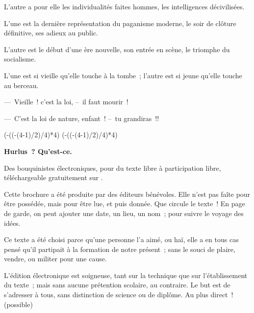 \documentclass[french,twoside]{book} %
\newcommand{\byline}[1]{\bigskip{\RaggedLeft{#1}\par}\bigskip}
\def\truncdiv#1#2{((#1-(#2-1)/2)/#2)}
\def\moduloop#1#2{(#1-\truncdiv{#1}{#2}*#2)}
\def\modulo#1#2{\number\numexpr\moduloop{#1}{#2}\relax}
\begin{document}
L’autre a pour elle les individualités faites hommes, les intelligences décivilisées.\par
L’une est la dernière représentation du paganisme moderne, le soir de clôture définitive, ses adieux au public.\par
L’autre est le début d’une ère nouvelle, son entrée en scène, le triomphe du socialisme.\par
L’une est si vieille qu’elle touche à la tombe ; l’autre est si jeune qu’elle touche au berceau.\par
— Vieille ! c’est la loi, – il faut mourir !\par
— C’est la loi de nature, enfant ! – tu grandiras !!\par

\byline{J. Déjacques.}
 


\ifbooklet
  \pagestyle{empty}
  \clearpage
  \ifnum\modulo{\value{page}}{4}=0 \hbox{}\newpage\hbox{}\newpage\fi
  \ifnum\modulo{\value{page}}{4}=1 \hbox{}\newpage\hbox{}\newpage\fi


  \hbox{}\newpage
  \ifodd\value{page}\hbox{}\newpage\fi
  {\centering\color{rubric}\bfseries\noindent\large
    Hurlus ? Qu’est-ce.\par
    \bigskip
  }
  \noindent Des bouquinistes électroniques, pour du texte libre à participation libre,
  téléchargeable gratuitement sur \href{https://hurlus.fr}{}.\par
  \bigskip
  \noindent Cette brochure a été produite par des éditeurs bénévoles.
  Elle n’est pas faîte pour être possédée, mais pour être lue, et puis donnée.
  Que circule le texte !
  En page de garde, on peut ajouter une date, un lieu, un nom ; pour suivre le voyage des idées.
  \par

  Ce texte a été choisi parce qu’une personne l’a aimé,
  ou haï, elle a en tous cas pensé qu’il partipait à la formation de notre présent ;
  sans le souci de plaire, vendre, ou militer pour une cause.
  \par

  L’édition électronique est soigneuse, tant sur la technique
  que sur l’établissement du texte ; mais sans aucune prétention scolaire, au contraire.
  Le but est de s’adresser à tous, sans distinction de science ou de diplôme.
  Au plus direct ! (possible)
  \par
\end{document}
